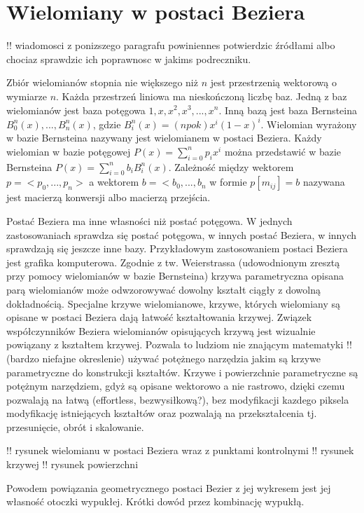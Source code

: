 \documentclass[11pt,a4paper,oneside]{report}
\begin{document}
\section{Wielomiany w postaci Beziera}

!! wiadomosci z ponizszego paragrafu powiniennes potwierdzic źródłami albo chociaz sprawdzic ich poprawnosc w jakims podreczniku.

Zbiór wielomianów stopnia nie większego niż $n$ jest przestrzenią wektorową o wymiarze $n$. Każda przestrzeń liniowa ma nieskończoną liczbę baz. Jedną z baz wielomianów jest baza potęgowa ${1,x,x^2,x^3,...,x^n}$. Inną bazą jest baza Bernsteina ${B^n_0(x),...,B^n_n(x)}$, gdzie $B^n_i(x) = (n po k)x^i(1-x)^i$. Wielomian wyrażony w bazie Bernsteina nazywany jest wielomianem w postaci Beziera. Każdy wielomian w bazie potęgowej $P(x) = \sum^n_{i=0}p_i x^i$ można przedstawić w bazie Bernsteina $P(x) = \sum^n_{i=0}b_i B^n_i(x)$. Zależność między wektorem $p = <p_0,...,p_n>$ a wektorem $b = <b_0, ..., b_n$ w formie $p [ m_{ij} ] = b$ nazywana jest macierzą konwersji albo macierzą przejścia.

Postać Beziera ma inne własności niż postać potęgowa. W jednych zastosowaniach sprawdza się postać potęgowa, w innych postać Beziera, w innych sprawdzają się jeszcze inne bazy. Przykładowym zastosowaniem postaci Beziera jest grafika komputerowa. Zgodnie z tw. Weierstrassa (udowodnionym zresztą przy pomocy wielomianów w bazie Bernsteina) krzywa parametryczna opisana parą wielomianów może odwzorowywać dowolny kształt ciągły z dowolną dokładnością. Specjalne krzywe wielomianowe, krzywe, których wielomiany są opisane w postaci Beziera dają łatwość kształtowania krzywej. Związek współczynników Beziera wielomianów opisujących krzywą jest wizualnie powiązany z kształtem krzywej. Pozwala to ludziom nie znającym matematyki !! (bardzo niefajne okreslenie) używać potężnego narzędzia jakim są krzywe parametryczne do konstrukcji kształtów. Krzywe i powierzchnie parametryczne są potężnym narzędziem, gdyż są opisane wektorowo a nie rastrowo, dzięki czemu pozwalają na łatwą (effortless, bezwysiłkową?), bez modyfikacji kazdego piksela modyfikację istniejących kształtów oraz pozwalają na przekształcenia tj. przesunięcie, obrót i skalowanie.

!! rysunek wielomianu w postaci Beziera wraz z punktami kontrolnymi
!! rysunek krzywej
!! rysunek powierzchni

Powodem powiązania geometrycznego postaci Bezier z jej wykresem jest jej własność otoczki wypukłej. Krótki dowód przez kombinację wypukłą.
\end{document}
